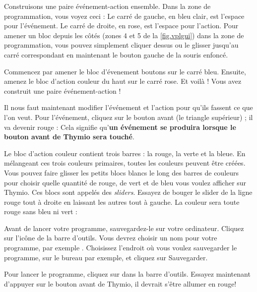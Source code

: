 
Construisons une paire événement-action ensemble.
Dans la zone de programmation, vous voyez ceci : 
Le carré de gauche, en bleu clair, est l'espace pour l'événement.
Le carré de droite, en rose, est l'espace pour l'action.
Pour amener un bloc depuis les côtés (zones 4 et 5 de la \cref{fig.vplgui}) dans la zone de programmation, vous pouvez simplement cliquer dessus ou le glisser jusqu'au carré correspondant en maintenant le bouton gauche de la souris enfoncé.

Commencez par amener le bloc d'évenement boutons  sur le carré bleu.
Ensuite, amenez le bloc d'action couleur du haut  sur le carré rose.
Et voilà ! Vous avez construit une paire événement-action !

Il nous faut maintenant modifier l'événement et l'action pour qu'ils fassent ce que l'on veut.
Pour l'événement, cliquez sur le bouton avant (le triangle supérieur) ; il va devenir rouge : 
Cela signifie qu'\textbf{un événement se produira lorsque le bouton avant de Thymio sera touché}.

Le bloc d'action couleur contient trois barres : la rouge, la verte et la bleue. En mélangeant ces trois couleurs primaires, toutes les couleurs peuvent être créées. Vous pouvez faire glisser les petits blocs blancs le long des barres de couleurs pour choisir quelle quantité de rouge, de vert et de bleu vous voulez afficher sur Thymio. Ces blocs sont appelés des \emph{sliders}. Essayez de bouger le slider de la ligne rouge tout à droite en laissant les autres tout à gauche.
La couleur sera toute rouge sans bleu ni vert : 


Avant de lancer votre programme, sauvegardez-le sur votre ordinateur.
Cliquez sur l'icône  de la barre d'outils.
Vous devrez choisir un nom pour votre programme, par exemple .
Choisissez l'endroit où vous voulez sauvegarder le programme, sur le bureau par exemple, et cliquez sur Sauvegarder.


Pour lancer le programme, cliquez sur  dans la barre d'outils.
Essayez maintenant d'appuyer sur le bouton avant de Thymio, il devrait s'être allumer en rouge!

